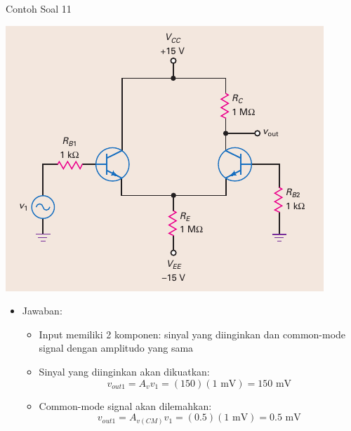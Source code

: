 \documentclass[aspectratio=169]{beamer}
\begin{document}
\begin{frame}{Contoh Soal 11}
	\begin{multicols}{2}
		\begin{center}
			\includegraphics[height=0.7\textheight]{gambar/01.fig22}
		\end{center}
		\columnbreak
		\begin{itemize}
			\item Jawaban:
			\begin{itemize}
				\item Input memiliki 2 komponen: sinyal yang diinginkan dan common-mode signal dengan amplitudo yang sama
				\item Sinyal yang diinginkan akan dikuatkan:
				\[ v_{out1} = A_v v_1 = (150)(1 \text{ mV}) = 150 \text{ mV} \]
				\item Common-mode signal akan dilemahkan:
				\[ v_{out1} = A_{v(CM)} v_1 = (0.5)(1 \text{ mV}) = 0.5 \text{ mV} \]
			\end{itemize}
		\end{itemize}
	\end{multicols}
\end{frame}
\end{document}
